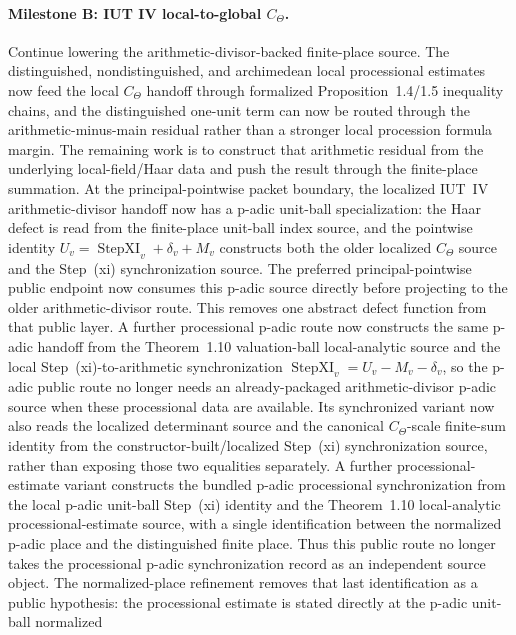 \documentclass[11pt]{article}
\newcommand{\IUT}{IUT}
\newcommand{\CTheta}{C_\Theta}
\theoremstyle{plain}
\theoremstyle{definition}
\theoremstyle{remark}
\begin{document}
\paragraph{Milestone B: \IUT{} IV local-to-global \(\CTheta\).}
Continue lowering the arithmetic-divisor-backed finite-place source.  The
distinguished, nondistinguished, and archimedean local processional estimates now
feed the local \(C_\Theta\) handoff through formalized Proposition~1.4/1.5
inequality chains, and the distinguished one-unit term can now be routed through
the arithmetic-minus-main residual rather than a stronger local procession
formula margin.  The remaining work is to construct that arithmetic residual
from the underlying local-field/Haar data and push the result through the
finite-place summation.
At the principal-pointwise packet boundary, the localized IUT~IV
arithmetic-divisor handoff now has a p-adic unit-ball specialization: the Haar
defect is read from the finite-place unit-ball index source, and the pointwise
identity \(U_v=\operatorname{StepXI}_v+\delta_v+M_v\) constructs both the
older localized \(C_\Theta\) source and the Step~(xi) synchronization source.
The preferred principal-pointwise public endpoint now consumes this p-adic
source directly before projecting to the older arithmetic-divisor route.  This
removes one abstract defect function from that public layer.  A further
processional p-adic route now constructs the same p-adic handoff from the
Theorem~1.10 valuation-ball local-analytic source and the local
Step~(xi)-to-arithmetic synchronization
\(\operatorname{StepXI}_v=U_v-M_v-\delta_v\), so the p-adic public route no
longer needs an already-packaged arithmetic-divisor p-adic source when these
processional data are available.  Its synchronized variant now also reads the
localized determinant source and the canonical \(C_\Theta\)-scale finite-sum
identity from the constructor-built/localized Step~(xi) synchronization source,
rather than exposing those two equalities separately.  A further
processional-estimate variant constructs the bundled p-adic processional
synchronization from the local p-adic unit-ball Step~(xi) identity and the
Theorem~1.10 local-analytic processional-estimate source, with a single
identification between the normalized p-adic place and the distinguished
finite place.  Thus this public route no longer takes the processional p-adic
synchronization record as an independent source object.  The normalized-place
refinement removes that last identification as a public hypothesis: the
processional estimate is stated directly at the p-adic unit-ball normalized
\end{document}
